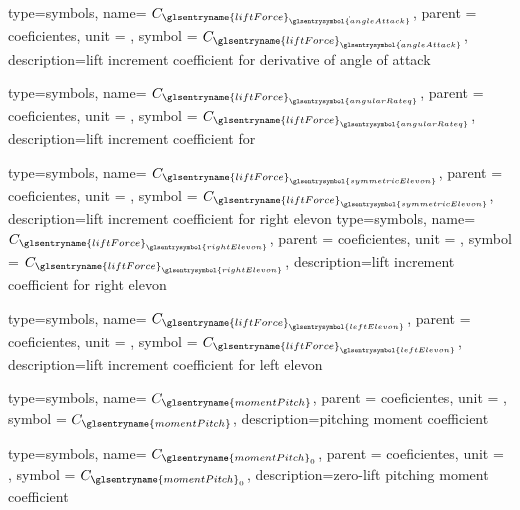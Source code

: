 {type=symbols,
    name= \ensuremath{C_{{\glsentryname{liftForce}}_{\dot{\glsentrysymbol{angleAttack}}}}},
    parent = {coeficientes},
    unit = \unexpanded{},
    symbol = \ensuremath{C_{{\glsentryname{liftForce}}_{\dot{\glsentrysymbol{angleAttack}}}}},
    description={lift increment coefficient for derivative of angle of attack}
}

{type=symbols,
    name= \ensuremath{C_{{\glsentryname{liftForce}}_{\glsentrysymbol{angularRateq}}}},
    parent = {coeficientes},
    unit = \unexpanded{},
    symbol = \ensuremath{C_{{\glsentryname{liftForce}}_{\glsentrysymbol{angularRateq}}}},
    description={lift increment coefficient for }
}

{type=symbols,
    name= \ensuremath{C_{{\glsentryname{liftForce}}_{\glsentrysymbol{symmetricElevon}}}},
    parent = {coeficientes},
    unit = \unexpanded{},
    symbol = \ensuremath{C_{{\glsentryname{liftForce}}_{\glsentrysymbol{symmetricElevon}}}},
    description={lift increment coefficient for right elevon}
}
{type=symbols,
    name= \ensuremath{C_{{\glsentryname{liftForce}}_{\glsentrysymbol{rightElevon}}}},
    parent = {coeficientes},
    unit = \unexpanded{},
    symbol = \ensuremath{C_{{\glsentryname{liftForce}}_{\glsentrysymbol{rightElevon}}}},
    description={lift increment coefficient for right elevon}
}

{type=symbols,
    name= \ensuremath{C_{{\glsentryname{liftForce}}_{\glsentrysymbol{leftElevon}}}},
    parent = {coeficientes},
    unit = \unexpanded{},
    symbol = \ensuremath{C_{{\glsentryname{liftForce}}_{\glsentrysymbol{leftElevon}}}},
    description={lift increment coefficient for left elevon}
}



{type=symbols,
    name= \ensuremath{C_{\glsentryname{momentPitch}}},
    parent = {coeficientes},
    unit = \unexpanded{},
    symbol = \ensuremath{C_{\glsentryname{momentPitch}}},
    description={pitching moment coefficient}
}

{type=symbols,
    name= \ensuremath{C_{{\glsentryname{momentPitch}}_{0}}},
    parent = {coeficientes},
    unit = \unexpanded{},
    symbol = \ensuremath{C_{{\glsentryname{momentPitch}}_{0}}},
    description={zero-lift pitching moment coefficient}
}

